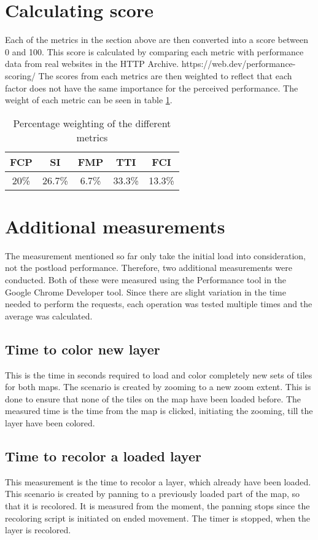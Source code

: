 \section{Calculating score}\label{ScoreCal}

Each of the metrics in the section above are then converted into a score between 0 and 100. This score is calculated by comparing each metric with performance data from real websites in the HTTP Archive.
https://web.dev/performance-scoring/
The scores from each metrics are then weighted to reflect that each factor does not have the same importance for the perceived performance. The weight of each metric can be seen in table \ref{tabScore}.


\begin{table}[htbp]
	\centering
\begin{tabular}{|c|c|c|c|c|}
	\hline 
	FCP & SI & FMP & TTI & FCI \\ 
	\hline 
	20\% & 26.7\% & 6.7\% & 33.3\% & 13.3\% \\ 
	\hline 
\end{tabular} 
	\caption{Percentage weighting of the different metrics}
	\label{tabScore}
\end{table}

\section{Additional measurements}

The measurement mentioned so far only take the initial load into consideration, not the postload performance. 
Therefore, two additional measurements were conducted. Both of these were measured using the Performance tool in the Google Chrome Developer tool. Since there are slight variation in the time needed to perform the requests, each operation was tested multiple times and the average was calculated. 
\subsection{Time to color new layer}
This is the time in seconds required to load and color completely new sets of tiles for both maps. The scenario is created by zooming to a new zoom extent. This is done to ensure that none of the tiles on the map have been loaded before. The measured time is the time from the map is clicked, initiating the zooming, till the layer have been colored.

\subsection{Time to recolor a loaded layer}
This measurement is the time to recolor a layer, which already have been loaded. This scenario is created by panning to a previously loaded part of the map, so that it is recolored. 
It is measured from the moment, the panning stops since the recoloring script is initiated on ended movement. The timer is stopped, when the layer is recolored.

